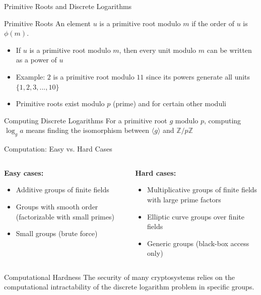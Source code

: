 \documentclass[aspectratio=169]{beamer}
\begin{document}
\begin{frame}{Primitive Roots and Discrete Logarithms}
  \begin{block}{Primitive Roots}
    An element $u$ is a \alert{primitive root} modulo $m$ if the order of $u$ is $\phi(m)$.
  \end{block}
  
  \begin{itemize}
    \item If $u$ is a primitive root modulo $m$, then every unit modulo $m$ can be written as a power of $u$
    \item Example: $2$ is a primitive root modulo $11$ since its powers generate all units $\{1,2,3,...,10\}$
    \item Primitive roots exist modulo $p$ (prime) and for certain other moduli
  \end{itemize}
  
  \begin{block}{Computing Discrete Logarithms}
    For a primitive root $g$ modulo $p$, computing $\log_g a$ means finding the isomorphism between $\langle g \rangle$ and $\mathbb{Z}/p\mathbb{Z}$
  \end{block}
\end{frame}

\begin{frame}{Computation: Easy vs. Hard Cases}
  \begin{columns}
    \begin{column}{0.48\textwidth}
      \textbf{Easy cases:}
      \begin{itemize}
        \item Additive groups of finite fields
        \item Groups with smooth order (factorizable with small primes)
        \item Small groups (brute force)
      \end{itemize}
    \end{column}
    \begin{column}{0.48\textwidth}
      \textbf{Hard cases:}
      \begin{itemize}
        \item Multiplicative groups of finite fields with large prime factors
        \item Elliptic curve groups over finite fields
        \item Generic groups (black-box access only)
      \end{itemize}
    \end{column}
  \end{columns}
  
  \vspace{0.5cm}
  \begin{block}{Computational Hardness}
    The security of many cryptosystems relies on the computational intractability of the discrete logarithm problem in specific groups.
  \end{block}
\end{frame}
\end{document}
